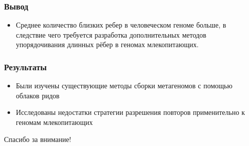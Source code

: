 \documentclass[12pt,pdf,hyperref={unicode}]{beamer}
\begin{document}
\begin{frame}
\frametitle{Вывод}
\begin{itemize}
\item Среднее количество близких ребер в человеческом геноме больше, в следствие чего требуется 
разработка дополнительных методов упорядочивания длинных рёбер в геномах млекопитающих.
\end{itemize}
\end{frame}

\begin{frame}
\frametitle{Результаты}
\begin{itemize}
\item Были изучены существующие методы сборки метагеномов с помощью облаков ридов
\item Исследованы недостатки стратегии разрешения повторов применительно к геномам млекопитающих
\end{itemize}
\end{frame}


\begin{frame}
\center
\Large Спасибо за внимание!
\end{frame}
\end{document}
